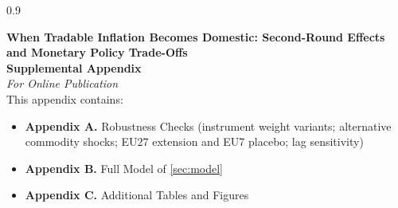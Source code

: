 \documentclass[a4paper,12pt]{article}
\begin{document}

\newpage
\clearpage
\newpage 
\begin{spacing}{0.9}


\end{spacing}

\clearpage




\appendix

\setcounter{table}{0}
\renewcommand{\thetable}{\Alph{section}.\arabic{table}}

\setcounter{figure}{0}
\renewcommand{\thefigure}{\Alph{section}.\arabic{figure}}

\begin{center}
    {\LARGE \textbf{When Tradable Inflation Becomes Domestic: Second-Round Effects and Monetary Policy Trade-Offs}} \\
    \vspace{2cm}
    \textbf{Supplemental Appendix} \\
    \vspace{0.2cm}
   \textit{For Online Publication} \\
    \vspace{0.5cm}
    This appendix contains:
\end{center}

\vspace{0.5cm}

\begin{itemize}
    \item \textbf{Appendix A.} Robustness Checks (instrument weight variants; alternative commodity shocks; EU27 extension and EU7 placebo; lag sensitivity)
    \item \textbf{Appendix B.} Full Model of \autoref{sec:model}
    \item \textbf{Appendix C.} Additional Tables and Figures
\end{itemize}
\end{document}
